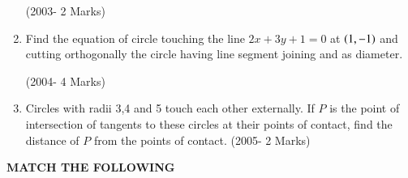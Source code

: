 \documentclass[journal,12pt,twocolumn]{IEEEtran}
\theoremstyle{remark}
\begin{document}
\begin{enumerate}
\hfill(2003- 2 Marks)\\ 





\item Find the equation of circle touching the line $2x+3y+1=0$ at $\left(1,-1\right)$ and cutting orthogonally the circle having line segment joining  and  as diameter.


\hfill(2004- 4 Marks)\\     




\item Circles with radii 3,4 and 5 touch each other externally. If $P$ is the point of intersection of tangents to these circles at their points of contact, find the distance of $P$ from the points of contact.
	           \hfill(2005- 2 Marks)\\ 
\end{enumerate}
\newpage

\textbf{MATCH THE FOLLOWING}\\
\end{document}
